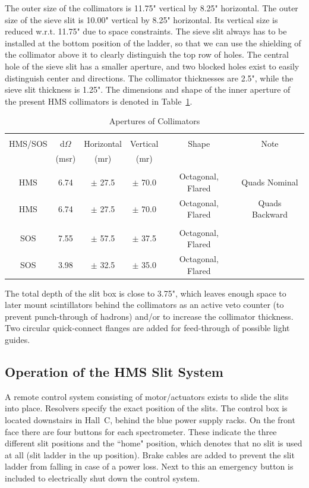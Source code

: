 The outer size of the collimators is 11.75" vertical by 8.25"
horizontal. The outer size of the sieve slit is 10.00" vertical
by 8.25" horizontal.
Its vertical size is reduced w.r.t. 11.75" due to space constraints.
The sieve slit always has to be installed at the bottom position of the ladder,
so that we can use the shielding of the collimator above it to
clearly distinguish the top row of holes. The central hole
of the sieve slit has a smaller aperture, and two blocked holes
exist to easily distinguish center and directions.
The collimator thicknesses are 2.5", while the sieve slit thickness
is 1.25". The dimensions and shape of the inner aperture of the present
HMS collimators is denoted in Table~\ref{tab:apertures}.

\begin{table}
\begin{center}
\caption{Apertures of Collimators\label{tab:apertures}}
\vspace{\baselineskip}
\begin{tabular}{|c|c|c|c|c|c|}
\hline
{} & {} & {} & {} & {} & {} \\
HMS/SOS & d$\Omega$ & Horizontal & Vertical & Shape & Note \\
{} & (msr) & (mr) & (mr) & {} & {} \\
{} & {} & {} & {} & {} & {} \\ \hline
HMS & 6.74 & $\pm$ 27.5 & $\pm$ 70.0 & Octagonal, Flared & Quads Nominal \\
HMS & 6.74 & $\pm$ 27.5 & $\pm$ 70.0 & Octagonal, Flared & Quads Backward \\
{} & {} & {} & {} & {} & {} \\
SOS & 7.55 & $\pm$ 57.5 & $\pm$ 37.5 & Octagonal, Flared & \\
SOS & 3.98 & $\pm$ 32.5 & $\pm$ 35.0 & Octagonal, Flared & \\
\hline
\end{tabular}
\end{center}
\end{table}

The total depth of the slit box is close to 3.75", which leaves
enough space to later mount scintillators behind the collimators as an active
veto counter (to prevent punch-through of hadrons) and/or to increase
the collimator thickness. Two circular quick-connect flanges are
added for feed-through of possible light guides.

\subsection{Operation of the HMS Slit System}\label{sssec:slit_control}
A remote control system consisting of motor/actuators exists to slide
the slits into place. Resolvers specify the exact position of the
slits.  The control box is located downstairs in Hall~C, behind the
blue power supply racks. On the front face there are four buttons for
each spectrometer. These indicate the three different slit positions
and the ``home" position, which denotes that no slit is used at all
(slit ladder in the up position).  Brake cables are added to prevent
the slit ladder from falling in case of a power loss. Next to this an
emergency button is included to electrically shut down the control
system.

